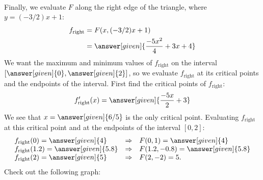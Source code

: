 \documentclass{ximera}
\begin{document}
\begin{example}
\begin{explanation}
\[\begin{array}{lcl}
    \end{array}
    \]
    Finally, we evaluate $F$ along the right edge of the triangle,
    where $y = (-3/2)x+1$:
    \begin{align*}
      f_{\mathrm{right}} &= F(x,(-3/2)x+1)\\
      &= \answer[given]{\frac{-5x^2}{4}+3x+4}
    \end{align*}
    We want the maximum and minimum values of $f_{\mathrm{right}}$ on
    the interval $\left[\answer[given]{0},\answer[given]{2}\right]$, so we
    evaluate $f_{\mathrm{right}}$ at its critical points and the
    endpoints of the interval. First find the critical points of
    $f_{\mathrm{right}}$:
    \[
    f'_{\mathrm{right}}(x) = \answer[given]{\frac{-5x}{2}+3}
    \]
    We see that $x = \answer[given]{6/5}$ is the only critical point.
    Evaluating $f_{\mathrm{right}}$ at this critical point and at the
    endpoints of the interval $[0,2]$:
    \[
    \begin{array}{lcl}
      f_{\mathrm{right}}(0) = \answer[given]{4} &\Rightarrow & F(0,1) = \answer[given]{4}\\
      f_{\mathrm{right}}(1.2) = \answer[given]{5.8} &\Rightarrow &  F(1.2,-0.8) = \answer[given]{5.8}\\
      f_{\mathrm{right}}(2) = \answer[given]{5} &\Rightarrow&  F(2,-2) = 5.
    \end{array}
    \]
    Check out the following graph:
    \begin{image}
\end{image}
\end{explanation}
\end{example}
\end{document}
